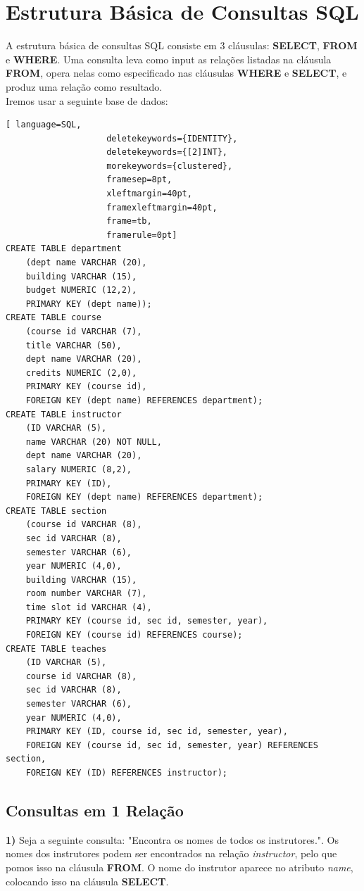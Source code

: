 \documentclass[titlepage]{book}
\theoremstyle{definition}
\begin{document}
\section{Estrutura Básica de Consultas SQL}
A estrutura básica de consultas SQL consiste em 3 cláusulas: \textbf{SELECT}, \textbf{FROM} e \textbf{WHERE}. Uma consulta leva como input as relações listadas na cláusula \textbf{FROM}, opera nelas como especificado nas cláusulas \textbf{WHERE} e \textbf{SELECT}, e produz uma relação como resultado. \\
Iremos usar a seguinte base de dados:
\begin{lstlisting}[ language=SQL,
                    deletekeywords={IDENTITY},
                    deletekeywords={[2]INT},
                    morekeywords={clustered},
                    framesep=8pt,
                    xleftmargin=40pt,
                    framexleftmargin=40pt,
                    frame=tb,
                    framerule=0pt]
CREATE TABLE department
    (dept name VARCHAR (20),
    building VARCHAR (15),
    budget NUMERIC (12,2),
    PRIMARY KEY (dept name));
CREATE TABLE course
    (course id VARCHAR (7),
    title VARCHAR (50),
    dept name VARCHAR (20),
    credits NUMERIC (2,0),
    PRIMARY KEY (course id),
    FOREIGN KEY (dept name) REFERENCES department);
CREATE TABLE instructor
    (ID VARCHAR (5),
    name VARCHAR (20) NOT NULL,
    dept name VARCHAR (20),
    salary NUMERIC (8,2),
    PRIMARY KEY (ID),
    FOREIGN KEY (dept name) REFERENCES department);
CREATE TABLE section
    (course id VARCHAR (8),
    sec id VARCHAR (8),
    semester VARCHAR (6),
    year NUMERIC (4,0),
    building VARCHAR (15),
    room number VARCHAR (7),
    time slot id VARCHAR (4),
    PRIMARY KEY (course id, sec id, semester, year),
    FOREIGN KEY (course id) REFERENCES course);
CREATE TABLE teaches
    (ID VARCHAR (5),
    course id VARCHAR (8),
    sec id VARCHAR (8),
    semester VARCHAR (6),
    year NUMERIC (4,0),
    PRIMARY KEY (ID, course id, sec id, semester, year),
    FOREIGN KEY (course id, sec id, semester, year) REFERENCES section,
    FOREIGN KEY (ID) REFERENCES instructor);
\end{lstlisting}

\subsection{Consultas em 1 Relação}
\textbf{1)} Seja a seguinte consulta: "Encontra os nomes de todos os instrutores.". Os nomes dos instrutores podem ser encontrados na relação \textit{instructor}, pelo que pomos isso na cláusula \textbf{FROM}. O nome do instrutor aparece no atributo \textit{name}, colocando isso na cláusula \textbf{SELECT}.
\end{document}
